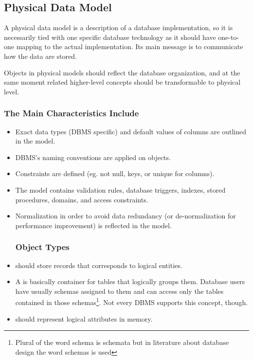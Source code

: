 \subsection{Physical Data Model}

A physical data model is a description of a database implementation, so it is necessarily tied with one specific database technology as it should have one-to-one mapping to the actual implementation. Its main message is to communicate how the data are stored.

Objects in physical models should reflect the database organization, and at the same moment related higher-level concepts should be transformable to physical level.

\subsubsection{The Main Characteristics Include}
\begin{itemize}
	\item Exact data types (DBMS specific) and default values of columns are outlined in the model.
	\item DBMS's naming conventions are applied on objects.
	\item Constraints are defined (eg. not null, keys, or unique for columns).
	\item The model contains validation rules, database triggers, indexes, stored procedures, domains, and access constraints.
	\item Normalization in order to avoid data redundancy (or de-normalization for performance improvement) is reflected in the model.
	\subsubsection{Object Types}
	\item {} should store records that corresponds to logical entities.
	\item A  is basically container for tables that logically groups them. Database users have usually schemas assigned to them and can access only the tables contained in those schemas\footnote{Plural of the word schema is schemata but in literature about database design the word schemas is used}. Not every DBMS supports this concept, though.
	\item {} should represent logical attributes in memory.
\end{itemize}

